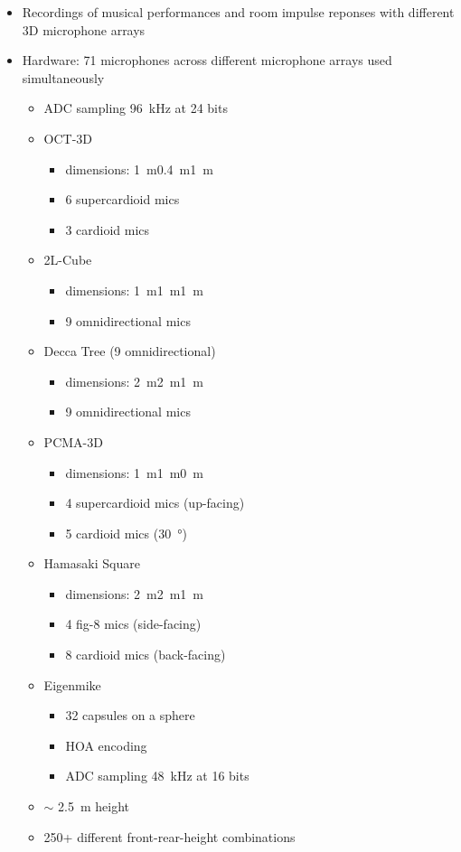 \documentclass[14pt, oneside]{extarticle}
\begin{document}
\begin{itemize}

\item Recordings of musical performances and room impulse reponses with different 3D microphone arrays \cite{lee3d}

\item Hardware: 71 microphones across different microphone arrays used simultaneously
	\begin{itemize}
	\item ADC sampling \SI{96}{\kilo\hertz} at 24 bits
	\item OCT-3D \cite{theile20123d}
		\begin{itemize}
		\item dimensions: \SI{1}{\metre}\texttimes\SI{0.4}{\metre}\texttimes\SI{1}{\metre}
		\item 6 supercardioid mics
		\item 3 cardioid mics
		\end{itemize}
	\item 2L-Cube 
		\begin{itemize}
		\item dimensions: \SI{1}{\metre}\texttimes\SI{1}{\metre}\texttimes\SI{1}{\metre}
		\item 9 omnidirectional mics
		\end{itemize}
	\item Decca Tree (9 omnidirectional)
		\begin{itemize}
		\item dimensions: \SI{2}{\metre}\texttimes\SI{2}{\metre}\texttimes\SI{1}{\metre}
		\item 9 omnidirectional mics
		\end{itemize}
	\item PCMA-3D \cite{lee2014effect}
		\begin{itemize}
		\item dimensions: \SI{1}{\metre}\texttimes\SI{1}{\metre}\texttimes\SI{0}{\metre}
		\item 4 supercardioid mics (up-facing)
		\item 5 cardioid mics (\SI{30}{\degree})
		\end{itemize}
	\item Hamasaki Square
		\begin{itemize}
		\item dimensions: \SI{2}{\metre}\texttimes\SI{2}{\metre}\texttimes\SI{1}{\metre}
		\item 4 fig-8 mics (side-facing)
		\item 8 cardioid mics (back-facing)
		\end{itemize}
	\item Eigenmike
		\begin{itemize}
		\item 32 capsules on a sphere
		\item HOA encoding
		\item ADC sampling \SI{48}{\kilo\hertz} at 16 bits
		\end{itemize}
	\item $\sim$ \SI{2.5}{\metre} height
	\item 250+ different front-rear-height combinations
	\end{itemize}


\end{itemize}
\end{document}
